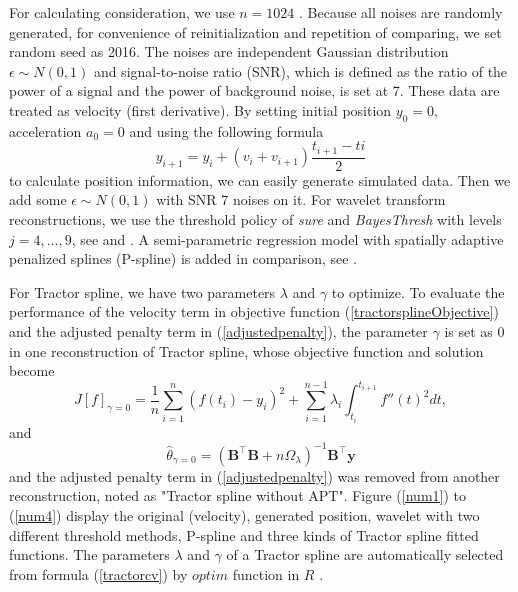 For calculating consideration, we use $n=1024$ \cite{nason2010wavelet}. Because all noises are randomly generated, for convenience of reinitialization and repetition of comparing, we set random seed as 2016. The noises are independent Gaussian distribution $\epsilon \sim N(0,1)$ and signal-to-noise ratio (SNR), which is defined as the ratio of the power of a signal and the power of background noise, is set at 7. These data are treated as velocity (first derivative). By setting initial position $y_0=0$, acceleration $a_0=0$ and using the following formula 
\begin{equation}
y_{i+1}=y_i+(v_i+v_{i+1})\frac{t_{i+1}-ti}{2}
\end{equation}
to calculate position information, we can easily generate simulated data. Then we add some \iid $\epsilon \sim N(0,1)$ with SNR 7 noises on it. For wavelet transform reconstructions, we use the threshold policy of \textit{sure} and \textit{BayesThresh} with levels $j=4, \ldots, 9$, see  \cite{donoho1995adapting} and \cite{abramovich1998wavelet}. A semi-parametric regression model with spatially adaptive penalized splines (P-spline) is added in comparison, see \cite{krivobokova2008fast} \cite{ruppert2003semiparametric}.

For Tractor spline, we have two parameters $\lambda$ and $\gamma$ to optimize. To evaluate the performance of the velocity term in objective function (\ref{tractorsplineObjective}) and the adjusted penalty term in (\ref{adjustedpenalty}), the parameter $\gamma$ is set as 0 in one reconstruction of Tractor spline, whose objective function and solution become
\begin{equation}\label{ofgamma0}
J[f]_{\gamma=0}= \frac{1}{n} \sum_{i=1}^{n} (f(t_i)-y_i)^2 +\sum_{i=1}^{n-1} \lambda_i\int_{t_i}^{t_{i+1}} f''(t)^2 dt,
\end{equation}
and
\begin{equation}\label{thetahat0}
\hat{\theta}_{\gamma=0}=(\mathbf{B}^\top\mathbf{B}+n\Omega_{\lambda})^{-1}\mathbf{B}^\top\mathbf{y}
\end{equation}
and the adjusted penalty term in (\ref{adjustedpenalty}) was removed from another reconstruction, noted as "Tractor spline without APT". Figure (\ref{num1}) to (\ref{num4}) display the original (velocity), generated position, wavelet with two different threshold methods, P-spline and three kinds of Tractor spline fitted functions. The parameters $\lambda$ and $\gamma$ of a Tractor spline are automatically selected from formula (\ref{tractorcv}) by $\textit{optim}$ function in $R$ \cite{nelder1965simplex}.



